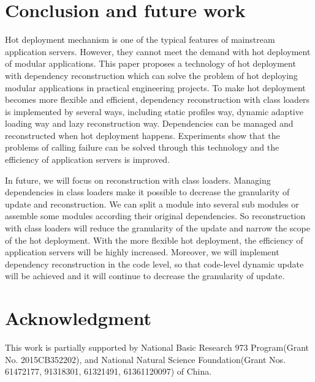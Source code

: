 \documentclass[conference]{IEEEtran}
\begin{document}
\section{Conclusion and future work\label{sec:conclusion}}
Hot deployment mechanism is one of the typical features of mainstream application servers.
However, they cannot meet the demand with hot deployment of modular applications.
This paper proposes a technology of hot deployment with dependency reconstruction which can solve the problem of hot deploying modular applications in practical engineering projects.
To make hot deployment becomes more flexible and efficient, dependency reconstruction with class loaders is implemented by several ways, including static profiles way, dynamic adaptive loading way and lazy reconstruction way.
Dependencies can be managed and reconstructed when hot deployment happens.
Experiments show that the problems of calling failure can be solved through this technology and the efficiency of application servers is improved.

In future, we will focus on reconstruction with class loaders.
Managing dependencies in class loaders make it possible to decrease the granularity of update and reconstruction.
We can split a module into several sub modules or assemble some modules according their original dependencies.
So reconstruction with class loaders will reduce the granularity of the update and narrow the scope of the hot deployment.
With the more flexible hot deployment, the efficiency of application servers will be highly increased.
Moreover, we will implement dependency reconstruction in the code level\cite{future_Gu}, so that code-level dynamic update will be achieved and it will continue to decrease the granularity of update.

\section*{Acknowledgment}
This work is partially supported by National Basic Research 973 Program(Grant No. 2015CB352202), and National Natural Science Foundation(Grant Nos. 61472177, 91318301, 61321491, 61361120097) of China.

\end{document}
